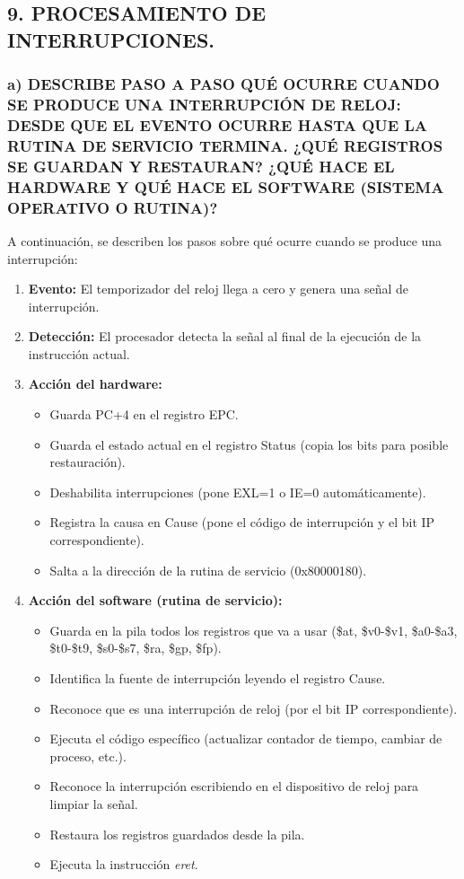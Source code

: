 \documentclass[12pt]{article}
\begin{document}
\subsection*{9. PROCESAMIENTO DE INTERRUPCIONES.}

\subsubsection*{a) DESCRIBE PASO A PASO QUÉ OCURRE CUANDO SE PRODUCE UNA INTERRUPCIÓN DE RELOJ: DESDE QUE EL EVENTO OCURRE HASTA QUE LA RUTINA DE SERVICIO TERMINA. ¿QUÉ REGISTROS SE GUARDAN Y RESTAURAN? ¿QUÉ HACE EL HARDWARE Y QUÉ HACE EL SOFTWARE (SISTEMA OPERATIVO O RUTINA)?}

A continuación, se describen los pasos sobre qué ocurre cuando se produce una interrupción:

\begin{enumerate}
    \item \textbf{Evento:} El temporizador del reloj llega a cero y genera una señal de interrupción.
    
    \item \textbf{Detección:} El procesador detecta la señal al final de la ejecución de la instrucción actual.
    
    \item \textbf{Acción del hardware:}
    \begin{itemize}
        \item Guarda PC+4 en el registro EPC.
        \item Guarda el estado actual en el registro Status (copia los bits para posible restauración).
        \item Deshabilita interrupciones (pone EXL=1 o IE=0 automáticamente).
        \item Registra la causa en Cause (pone el código de interrupción y el bit IP correspondiente).
        \item Salta a la dirección de la rutina de servicio (0x80000180).
    \end{itemize}
    
    \item \textbf{Acción del software (rutina de servicio):}
    \begin{itemize}
        \item Guarda en la pila todos los registros que va a usar (\$at, \$v0-\$v1, \$a0-\$a3, \$t0-\$t9, \$s0-\$s7, \$ra, \$gp, \$fp).
        \item Identifica la fuente de interrupción leyendo el registro Cause.
        \item Reconoce que es una interrupción de reloj (por el bit IP correspondiente).
        \item Ejecuta el código específico (actualizar contador de tiempo, cambiar de proceso, etc.).
        \item Reconoce la interrupción escribiendo en el dispositivo de reloj para limpiar la señal.
        \item Restaura los registros guardados desde la pila.
        \item Ejecuta la instrucción \textit{eret}.
    \end{itemize}
    

\end{enumerate}
\end{document}
